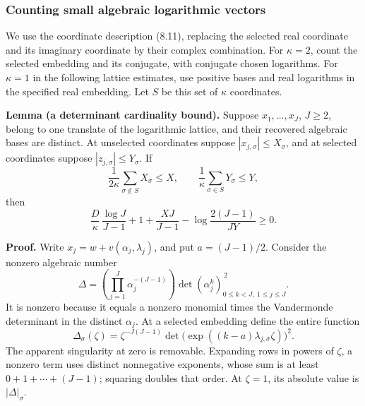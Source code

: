 \documentclass[
  11pt,
  a4paper,
]{article}
\begin{document}
\subsubsection{Counting small algebraic logarithmic
vectors}\label{counting-small-algebraic-logarithmic-vectors}

We use the coordinate description (8.11), replacing the selected real
coordinate and its imaginary coordinate by their complex combination.
For \(\kappa=2\), count the selected embedding and its conjugate, with
conjugate chosen logarithms. For \(\kappa=1\) in the following lattice
estimates, use positive bases and real logarithms in the specified real
embedding. Let \(S\) be this set of \(\kappa\) coordinates.

\textbf{Lemma (a determinant cardinality bound).} Suppose
\(x_1,\ldots,x_J\), \(J\ge2\), belong to one translate of the
logarithmic lattice, and their recovered algebraic bases are distinct.
At unselected coordinates suppose \(|x_{j,\sigma}|\le X_\sigma\), and at
selected coordinates suppose \(|z_{j,\sigma}|\le Y_\sigma\). If \[
\frac1{2\kappa}\sum_{\sigma\notin S}X_\sigma\le X,\qquad
\frac1\kappa\sum_{\sigma\in S}Y_\sigma\le Y,
\] then \[
\frac D\kappa\,\frac{\log J}{J-1}
+1+\frac{XJ}{J-1}
-\log\frac{2(J-1)}{JY}\ge0.
\tag{8.17}
\]

\textbf{Proof.} Write \(x_j=w+v(\alpha_j,\lambda_j)\), and put
\(a=(J-1)/2\). Consider the nonzero algebraic number \[
\Delta=
\left(\prod_{j=1}^J\alpha_j^{-(J-1)}\right)
\det(\alpha_j^k)_{0\le k<J,\ 1\le j\le J}^{\,2}.
\] It is nonzero because it equals a nonzero monomial times the
Vandermonde determinant in the distinct \(\alpha_j\). At a selected
embedding define the entire function \[
\Delta_\sigma(\zeta)=
\zeta^{-J(J-1)}
\det\big(\exp((k-a)\lambda_{j,\sigma}\zeta)\big)^2.
\] The apparent singularity at zero is removable. Expanding rows in
powers of \(\zeta\), a nonzero term uses distinct nonnegative exponents,
whose sum is at least \(0+1+\cdots+(J-1)\); squaring doubles that order.
At \(\zeta=1\), its absolute value is \(|\Delta|_\sigma\).
\end{document}
